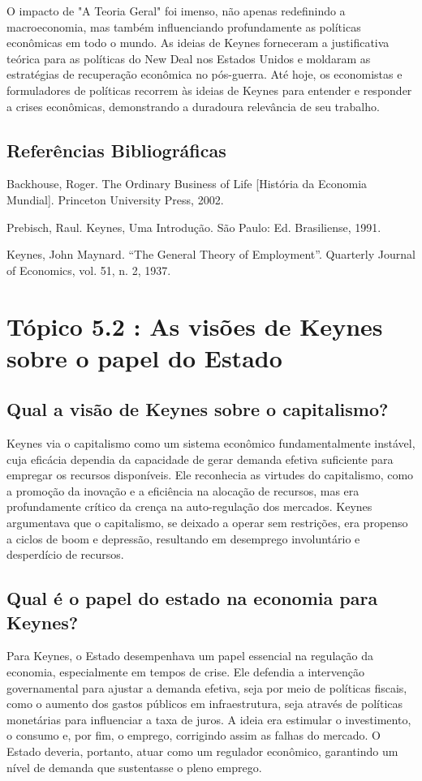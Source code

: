 \documentclass[a4paper,12pt]{article}[abntex2]
\begin{document}
O impacto de "A Teoria Geral" foi imenso, não apenas redefinindo a macroeconomia, mas também influenciando profundamente as políticas econômicas em todo o mundo. As ideias de Keynes forneceram a justificativa teórica para as políticas do New Deal nos Estados Unidos e moldaram as estratégias de recuperação econômica no pós-guerra. Até hoje, os economistas e formuladores de políticas recorrem às ideias de Keynes para entender e responder a crises econômicas, demonstrando a duradoura relevância de seu trabalho.

\subsection{\textbf{Referências Bibliográficas}}
Backhouse, Roger. The Ordinary Business of Life [História da Economia Mundial]. Princeton
University Press, 2002.

Prebisch, Raul. Keynes, Uma Introdução. São Paulo: Ed. Brasiliense, 1991.

Keynes, John Maynard. “The General Theory of Employment”. Quarterly Journal of Economics,
vol. 51, n. 2, 1937.

\newpage
\section{\textbf{Tópico 5.2 : As visões de Keynes sobre o papel do Estado}}
\subsection{\textbf{Qual a visão de Keynes sobre o capitalismo?}}
Keynes via o capitalismo como um sistema econômico fundamentalmente instável, cuja eficácia dependia da capacidade de gerar demanda efetiva suficiente para empregar os recursos disponíveis. Ele reconhecia as virtudes do capitalismo, como a promoção da inovação e a eficiência na alocação de recursos, mas era profundamente crítico da crença na auto-regulação dos mercados. Keynes argumentava que o capitalismo, se deixado a operar sem restrições, era propenso a ciclos de boom e depressão, resultando em desemprego involuntário e desperdício de recursos.
\subsection{\textbf{Qual é o papel do estado na economia para Keynes?}}
Para Keynes, o Estado desempenhava um papel essencial na regulação da economia, especialmente em tempos de crise. Ele defendia a intervenção governamental para ajustar a demanda efetiva, seja por meio de políticas fiscais, como o aumento dos gastos públicos em infraestrutura, seja através de políticas monetárias para influenciar a taxa de juros. A ideia era estimular o investimento, o consumo e, por fim, o emprego, corrigindo assim as falhas do mercado. O Estado deveria, portanto, atuar como um regulador econômico, garantindo um nível de demanda que sustentasse o pleno emprego.
\end{document}
